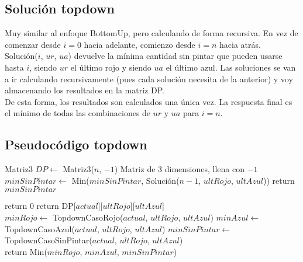 \subsection{Solución topdown}

Muy similar al enfoque BottomUp, pero calculando de forma recursiva. En vez de comenzar desde $i = 0$ hacia adelante, comienzo desde $i = n$ hacia atrás. \\

Solución($i$, $ur$, $ua$) devuelve la mínima cantidad sin pintar que pueden usarse hasta $i$, siendo $ur$ el último rojo y siendo $ua$ el último azul. Las soluciones se van a ir calculando recursivamente (pues cada solución necesita de la anterior) y voy almacenando los resultados en la matriz DP. \\

De esta forma, los resultados son calculados una única vez. La respuesta final es el mínimo de todas las combinaciones de $ur$ y $ua$ para $i = n$. \\


\subsection{Pseudocódigo topdown}

\begin{algorithm}[H]
\begin{algorithmic}
  \State Matriz3 $DP \gets$ Matriz3($n$, $-1$) \Comment Matriz de 3 dimensiones, llena con $-1$
            \State $minSinPintar \gets$ Min($minSinPintar$, Solución($n-1$, $ultRojo$, $ultAzul$))
        \EndFor
    \EndFor
    \State return $minSinPintar$
\EndProcedure
\end{algorithmic}
\end{algorithm} 


\begin{algorithm}[H]
\begin{algorithmic}
        return $0$
    \EndIf
        return DP[$actual$][$ultRojo$][$ultAzul$]
    \EndIf \\

    \State $minRojo \gets$ TopdownCasoRojo($actual$, $ultRojo$, $ultAzul$)
    \State $minAzul \gets$ TopdownCasoAzul($actual$, $ultRojo$, $ultAzul$)
    \State $minSinPintar \gets$ TopdownCasoSinPintar($actual$, $ultRojo$, $ultAzul$) \\

    \State return Min($minRojo$, $minAzul$, $minSinPintar$)
\EndProcedure
\end{algorithmic}
\end{algorithm} 


